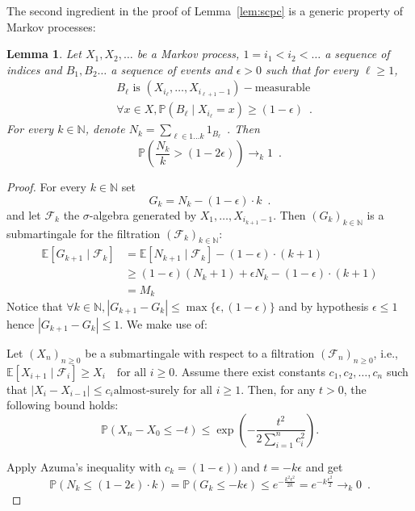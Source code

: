 \documentclass[11pt]{article}
\newtheorem{lemma}{Lemma}
\newcommand{\NN}{\mathbb{N}}
\newcommand{\PP}{\mathbb{P}}
\newcommand{\EE}{\mathbb{E}}
\begin{document}
The second ingredient in the proof of Lemma~\ref{lem:scpc} 
is a generic property of Markov processes:
\begin{lemma}
\label{lem:tool}
Let $X_1,X_2,\ldots$ be a Markov process,
$1 = i_1< i_2<\ldots $ a sequence of indices and
$B_1,B_2\ldots$ a sequence of events
and $\epsilon>0$
such that
for every $\ell \geq 1$,
\begin{align}
&B_\ell \text{ is } (X_{i_\ell},\ldots, X_{i_{\ell+1}-1})-\text{measurable}\\
& \forall x \in X, \PP(B_\ell \mid X_{i_\ell} = x)\geq (1- \epsilon)\enspace.
\end{align}
For every $k\in \NN$, denote
$
N_k = \sum_{\ell \in 1 \ldots k} 1_{B_\ell}\enspace.
$
Then
\[
\PP\left(\frac{N_k}{k} > \left(1-2\epsilon\right) \right) \to_k 1\enspace.
\]
\end{lemma}
\begin{proof}
For every $k\in \NN$ set
\[
G_k = N_k - (1-\epsilon) \cdot k\enspace.
\]
and let
$\mathcal{F}_k$ the $\sigma$-algebra generated by $X_{1},\ldots, X_{i_{k+1}-1}$.
Then $(G_k)_{k\in \NN}$ is a submartingale for the filtration $(\mathcal{F}_k)_{k\in \NN}$:
\begin{align*}
\EE[G_{k+1} \mid \mathcal{F}_k]
&= \EE[N_{k+1} \mid \mathcal{F}_k] - (1-\epsilon) \cdot (k+1)\\
&\geq (1-\epsilon)(N_k +1) + \epsilon N_k - (1-\epsilon) \cdot (k+1)\\
&= M_{k} 
\end{align*}
Notice that $\forall k\in \NN, |G_{k+1} - G_k| \leq \max\{\epsilon, (1 - \epsilon)\}$
and by hypothesis $\epsilon \leq 1$ hence $|G_{k+1} - G_k|\leq 1$.
We make use of:
\begin{theorem}\label{thm:azuma}
Let $(X_n)_{n \geq 0}$ be a submartingale with respect to a filtration $(\mathcal{F}_n)_{n \geq 0}$, i.e., 
$
\mathbb{E}[X_{i+1} \mid \mathcal{F}_i] \geq X_i \quad \text{for all } i \geq 0.
$
Assume there exist constants $c_1, c_2, \ldots, c_n$ such that 
$
|X_i - X_{i-1}| \leq c_i  \text{almost-surely for all } i \geq 1.
$
Then, for any $t > 0$, the following bound holds:
\[
\mathbb{P}\left(X_n - X_0 \leq -t\right) \leq \exp\left(-\frac{t^2}{2 \sum_{i=1}^n c_i^2}\right).
\]
\end{theorem}
Apply Azuma's inequality with $c_k=(1 - \epsilon))$ and $t=-k\epsilon$ and get
\[
\mathbb{P}\left(N_k \leq (1 -2\epsilon)\cdot k \right)
=
\mathbb{P}\left(G_k \leq -k\epsilon \right) \leq e^{-\frac{k^2\epsilon^2}{2 k}}
=
e^{-k\frac{\epsilon^2}{2 }}
\to_k 0
\enspace.
\]
\end{proof}
\end{document}
